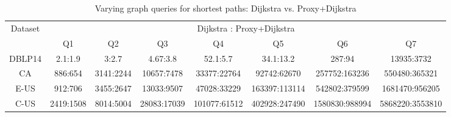 \begin{table}[t!]
\label{tab:performance_path_queries_dj}
\caption{Varying graph queries for shortest paths: Dijkstra vs. Proxy+Dijkstra}
\vspace{-1ex}
\begin{center}
\begin{tabular}{|c|c|c|c|c|c|c|c|}
\hline
\multirow{2}{*}{Dataset} & \multicolumn{7}{c|}{Dijkstra : Proxy+Dijkstra} \\ \cline{2-8}
 & Q1 & Q2 & Q3 & Q4 & Q5 & Q6 &Q7  \\ \hline \hline
 DBLP14 & 2.1:1.9 & 3:2.7 & 4.67:3.8 & 52.1:5.7 & 34.1:13.2 & 287:94 & 13935:3732 \\ \hline
 CA & 886:654 & 3141:2244 & 10657:7478 & 33377:22764 & 92742:62670 & 257752:163236 & 550480:365321 \\ \hline
 E-US & 912:706 & 3455:2647 & 13033:9507 & 47028:33229 & 163397:113114 & 542802:379599 & 1681470:956205 \\ \hline
 C-US & 2419:1508 & 8014:5004 & 28083:17039 & 101077:61512 & 402928:247490 & 1580830:988994 & 5868220:3553810  \\ \hline
\end{tabular}
\end{center}
\end{table}

